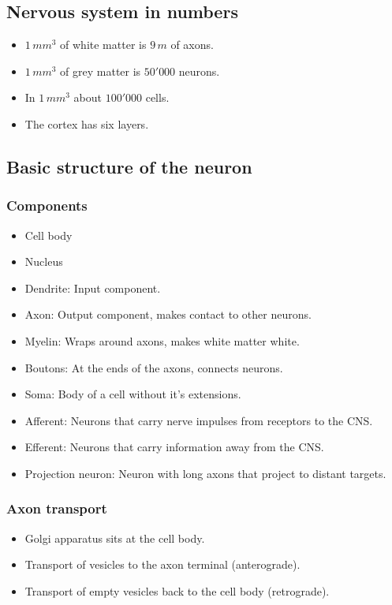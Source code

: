 \documentclass[main]{subfiles}
\begin{document}
\subsection{Nervous system in numbers}
\begin{itemize}[noitemsep,nolistsep]
	\item $1\,mm^3$ of white matter is $9\,m$ of axons.
	\item $1\,mm^3$ of grey matter is $50'000$ neurons.
	\item In $1\,mm^3$ about $100'000$ cells.
	\item The cortex has six layers.
\end{itemize}

\subsection{Basic structure of the neuron}
\subsubsection{Components}
\begin{itemize}[noitemsep,nolistsep]
	\item Cell body
	\item Nucleus
	\item Dendrite: Input component.
	\item Axon: Output component, makes contact to other neurons.
	\item Myelin: Wraps around axons, makes white matter white.
	\item Boutons: At the ends of the axons, connects neurons.
	\item Soma: Body of a cell without it's extensions.
	\item Afferent: Neurons that carry nerve impulses from receptors to the CNS.
	\item Efferent: Neurons that carry information away from the CNS.
	\item Projection neuron: Neuron with long axons that project to distant targets.
\end{itemize}
\subsubsection{Axon transport}
\begin{itemize}[noitemsep,nolistsep]
	\item Golgi apparatus sits at the cell body.
	\item Transport of vesicles to the axon terminal (anterograde).
	\item Transport of empty vesicles back to the cell body (retrograde).
\end{itemize}
\end{document}
